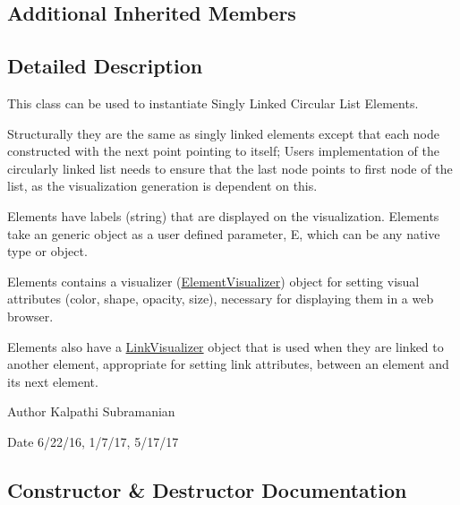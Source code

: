 \subsection*{Additional Inherited Members}


\subsection{Detailed Description}
This class can be used to instantiate Singly Linked Circular List Elements. 

Structurally they are the same as singly linked elements except that each node constructed with the next point pointing to itself; User\textquotesingle{}s implementation of the circularly linked list needs to ensure that the last node points to first node of the list, as the visualization generation is dependent on this.

Elements have labels (string) that are displayed on the visualization. Elements take an generic object as a user defined parameter, E, which can be any native type or object.

Elements contains a visualizer (\hyperlink{namespace_bridges_1_1_element_visualizer}{Element\+Visualizer}) object for setting visual attributes (color, shape, opacity, size), necessary for displaying them in a web browser.

Elements also have a \hyperlink{namespace_bridges_1_1_link_visualizer}{Link\+Visualizer} object that is used when they are linked to another element, appropriate for setting link attributes, between an element and its next element.

\begin{DoxyAuthor}{Author}
Kalpathi Subramanian
\end{DoxyAuthor}
\begin{DoxyDate}{Date}
6/22/16, 1/7/17, 5/17/17 
\end{DoxyDate}


\subsection{Constructor \& Destructor Documentation}
\hypertarget{class_bridges_1_1_circ_s_lelement_1_1_circ_s_lelement_a5e62edf5e21d8f3019905fbeee4bf769}{}
